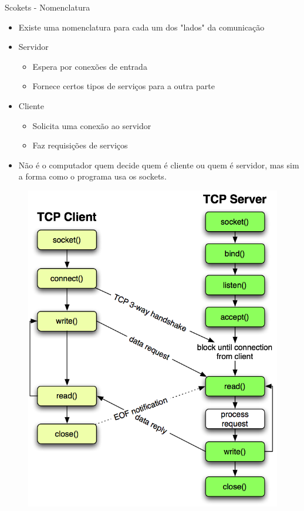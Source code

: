 \documentclass[10pt, xcolor=x11names]{beamer}
\begin{document}
\begin{frame}
	\begin{block}{Scokets - Nomenclatura}
		\begin{itemize}
			\item<1-> Existe uma nomenclatura para cada um dos "lados" da comunicação
			\item<2-> Servidor
				\begin{itemize}
					\item Espera por conexões de entrada
					\item Fornece certos tipos de serviços para a outra parte
				\end{itemize}
			\item<3-> Cliente
				\begin{itemize}
					\item Solicita uma conexão ao servidor
					\item Faz requisições de serviços
				\end{itemize}
			
			\item<4-> Não é o computador quem decide quem é cliente ou quem é servidor, mas sim a forma como o programa usa os sockets.
		\end{itemize}
	\end{block}
\end{frame}


\begin{frame}
	\begin{figure}
		\includegraphics[width=.55\linewidth]{img/tcplab}
	\end{figure}	
\end{frame}
\end{document}
